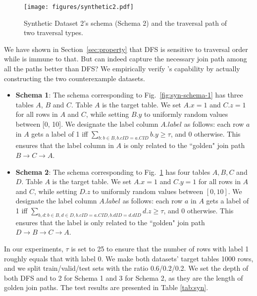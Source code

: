 \begin{figure}
    \centering
    \texttt{[image: figures/synthetic2.pdf]}
    \caption{Synthetic Dataset 2's schema (Schema 2) and the traversal path of two traversal types.}
    \label{fig:syn-schema-2}
\end{figure}

We have shown in Section~\ref{sec:property} that DFS is sensitive to traversal order while \model{} is immune to that.  But can \model{} indeed capture the necessary join path among all the paths better than DFS?  We empirically verify \model{}'s capability by actually constructing the two counterexample datasets.
\begin{itemize}[leftmargin=*]
\item \textbf{Schema 1}: The schema corresponding to Fig.~\ref{fig:syn-schema-1} has three tables $A$, $B$ and $C$. Table $A$ is the target table. We set $A.x = 1$ and $C.z = 1$ for all rows in $A$ and $C$, while setting $B.y$ to uniformly random values between [0, 10].  We designate the label column $A.label$ as follows: each row $a$ in $A$ gets a label of 1 iff $\sum_{b: b \in B, b.cID=a.CID} b.y \geq \tau$, and 0 otherwise.  This ensures that the label column in $A$ is only related to the ``golden" join path $B \rightarrow C \rightarrow A$.

\item \textbf{Schema 2}: The schema corresponding to Fig.~\ref{fig:syn-schema-2} has four tables $A, B, C$ and $D$. Table $A$ is the target table. We set $A.x = 1$ and $C.y = 1$ for all rows in $A$ and $C$, while setting $D.z$ to uniformly random values between $[0, 10]$. We designate the label column $A.label$ as follows: each row $a$ in $A$ gets a label of 1 iff $\sum_{b, d: b \in B, d \in D, b.cID=a.CID, b.dID=d.dID} d.z \geq \tau$, and 0 otherwise. This ensures that the label is only related to the ``golden" join path $D\rightarrow B\rightarrow C\rightarrow A$.
\end{itemize}

In our experiments, $\tau$ is set to 25 to ensure that the number of rows with label 1 roughly equals that with label 0. We make both datasets' target tables 1000 rows, and we split train/valid/test sets with the ratio 0.6/0.2/0.2. We set the depth of both DFS and \model{} to 2 for Schema 1 and 3 for Schema 2, as they are the length of golden join paths. The test results are presented in Table \ref{tab:syn}.

